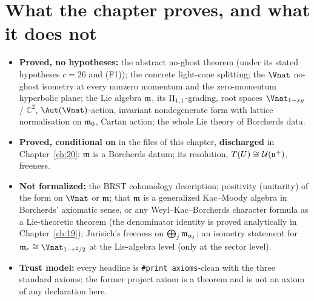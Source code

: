 \section{What the chapter proves, and what it does not}\label{ch18:sec:scope}

\begin{itemize}
\item \textbf{Proved, no hypotheses:} the abstract no-ghost theorem (under its stated hypotheses $c=26$ and (F1)); the concrete
  light-cone splitting; the $\Vnat$ no-ghost isometry at every nonzero momentum and the zero-momentum hyperbolic plane; the Lie algebra
  $\mathfrak{m}$, its $\mathrm{II}_{1,1}$-grading, root spaces $\Vnat_{1-xy}$ / $\mathbb C^2$, $\Aut(\Vnat)$-action, invariant nondegenerate form with lattice
  normalisation on $\mathfrak{m}_0$, Cartan action; the whole Lie theory of Borcherds data.
\item \textbf{Proved, conditional on } in the files of this chapter, \textbf{discharged} in Chapter~\ref{ch:20}: $\mathfrak{m}$ is a
  Borcherds datum; its resolution, $T(U)\cong \mathcal U(\mathfrak{u}^+)$, freeness.
\item \textbf{Not formalized:} the BRST cohomology description; positivity (unitarity) of the form on $\Vnat$ or $\mathfrak{m}$; that $\mathfrak{m}$ is a
  generalized Kac--Moody algebra in Borcherds' axiomatic sense, or any Weyl--Kac--Borcherds character formula as a Lie-theoretic
  theorem (the denominator identity is proved analytically in Chapter~\ref{ch:19}); Jurisich's freeness on $\bigoplus_j\mathfrak{m}_{\alpha_j}$; an
  isometry statement for $\chXVIIIm_r\cong\Vnat_{1-r^2/2}$ at the Lie-algebra level (only at the sector level).
\item \textbf{Trust model:} every headline is \texttt{\#print axioms}-clean with the three standard axioms; the former project axiom
   is a theorem and is not an axiom of any declaration here.
\end{itemize}

